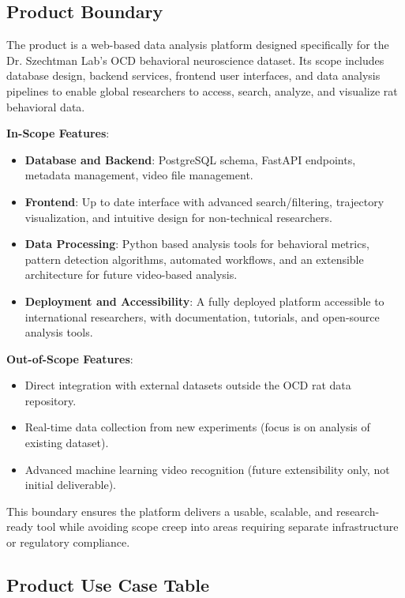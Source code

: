 \documentclass[12pt]{article}
\begin{document}
\subsection{Product Boundary}
The product is a web-based data analysis platform designed specifically for the Dr. Szechtman Lab’s OCD behavioral neuroscience dataset. Its scope includes database design, backend services, frontend user interfaces, and data analysis pipelines to enable global researchers to access, search, analyze, and visualize rat behavioral data.

\textbf{In-Scope Features}:
\begin{itemize}
    \item \textbf{Database and Backend}: PostgreSQL schema, FastAPI endpoints, metadata management, video file management.
    \item \textbf{Frontend}: Up to date interface with advanced search/filtering, trajectory visualization, and intuitive design for non-technical researchers.
    \item \textbf{Data Processing}: Python based analysis tools for behavioral metrics, pattern detection algorithms, automated workflows, and an extensible architecture for future video-based analysis.
    \item \textbf{Deployment and Accessibility}: A fully deployed platform accessible to international researchers, with documentation, tutorials, and open-source analysis tools.
\end{itemize}

\textbf{Out-of-Scope Features}:
\begin{itemize}
    \item Direct integration with external datasets outside the OCD rat data repository.
    \item Real-time data collection from new experiments (focus is on analysis of existing dataset).
    \item Advanced machine learning video recognition (future extensibility only, not initial deliverable).
\end{itemize}

This boundary ensures the platform delivers a usable, scalable, and research-ready tool while avoiding scope creep into areas requiring separate infrastructure or regulatory compliance.

\subsection{Product Use Case Table}
\end{document}
